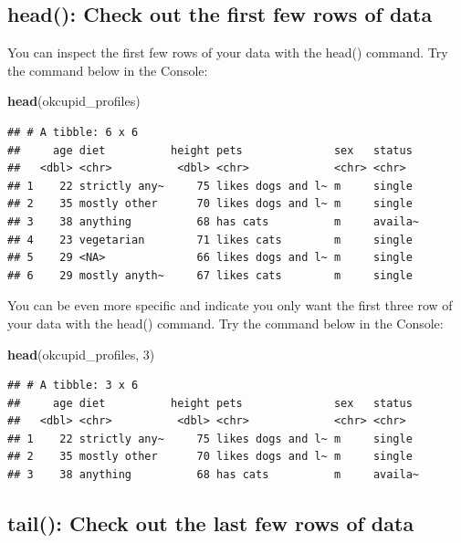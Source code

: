 \documentclass[
]{krantz}
\makeatletter
\newenvironment{Shaded}{\begin{snugshade}}{\end{snugshade}}
\newcommand{\DecValTok}[1]{\textcolor[rgb]{0.06,0.06,0.06}{#1}}
\newcommand{\KeywordTok}[1]{\textcolor[rgb]{0.27,0.27,0.27}{\textbf{#1}}}
\newcommand{\NormalTok}[1]{#1}
\newenvironment{kframe}{%
\medskip{}
\setlength{\fboxsep}{.8em}
 \def\at@end@of@kframe{}%
 \ifinner\ifhmode%
  \def\at@end@of@kframe{\end{minipage}}%
  \begin{minipage}{\columnwidth}%
 \fi\fi%
 \def\FrameCommand##1{\hskip\@totalleftmargin \hskip-\fboxsep
 \colorbox{shadecolor}{##1}\hskip-\fboxsep
     \hskip-\linewidth \hskip-\@totalleftmargin \hskip\columnwidth}%
 \MakeFramed {\advance\hsize-\width
   \@totalleftmargin\z@ \linewidth\hsize
   \@setminipage}}%
 {\par\unskip\endMakeFramed%
 \at@end@of@kframe}
\renewenvironment{Shaded}{\begin{kframe}}{\end{kframe}}
\makeatother
\begin{document}
\hypertarget{head-check-out-the-first-few-rows-of-data}{%
\subsection{head(): Check out the first few rows of data}\label{head-check-out-the-first-few-rows-of-data}}

You can inspect the first few rows of your data with the head() command. Try the command below in the Console:

\begin{Shaded}
\begin{Highlighting}[]
\KeywordTok{head}\NormalTok{(okcupid_profiles)}
\end{Highlighting}
\end{Shaded}

\begin{verbatim}
## # A tibble: 6 x 6
##     age diet          height pets              sex   status 
##   <dbl> <chr>          <dbl> <chr>             <chr> <chr>  
## 1    22 strictly any~     75 likes dogs and l~ m     single 
## 2    35 mostly other      70 likes dogs and l~ m     single 
## 3    38 anything          68 has cats          m     availa~
## 4    23 vegetarian        71 likes cats        m     single 
## 5    29 <NA>              66 likes dogs and l~ m     single 
## 6    29 mostly anyth~     67 likes cats        m     single
\end{verbatim}

You can be even more specific and indicate you only want the first three row of your data with the head() command. Try the command below in the Console:

\begin{Shaded}
\begin{Highlighting}[]
\KeywordTok{head}\NormalTok{(okcupid_profiles, }\DecValTok{3}\NormalTok{)}
\end{Highlighting}
\end{Shaded}

\begin{verbatim}
## # A tibble: 3 x 6
##     age diet          height pets              sex   status 
##   <dbl> <chr>          <dbl> <chr>             <chr> <chr>  
## 1    22 strictly any~     75 likes dogs and l~ m     single 
## 2    35 mostly other      70 likes dogs and l~ m     single 
## 3    38 anything          68 has cats          m     availa~
\end{verbatim}

\hypertarget{tail-check-out-the-last-few-rows-of-data}{%
\subsection{tail(): Check out the last few rows of data}\label{tail-check-out-the-last-few-rows-of-data}}
\end{document}
